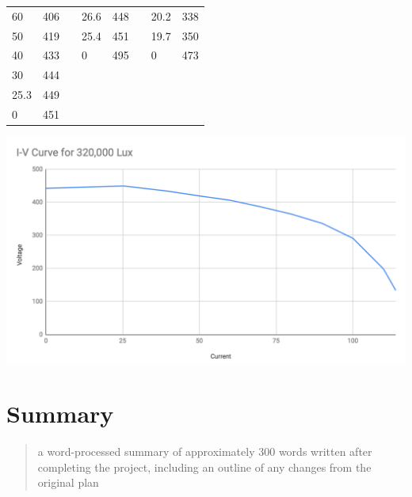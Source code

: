 \documentclass{article}
\begin{document}
\begin{table}[!ht]
\begin{tabular}{|l|l|l|l|l|l|l|l|}
60                     & 406               &                 & 26.6                   & 448               &                 & 20.2                   & 338               \\ \cline{1-2} \cline{4-5} \cline{7-8}
50                     & 419               &                 & 25.4                   & 451               &                 & 19.7                   & 350               \\ \cline{1-2} \cline{4-5} \cline{7-8}
40                     & 433               &                 & 0                      & 495               &                 & 0                      & 473               \\ \cline{1-2} \cline{4-5} \cline{7-8}
30                     & 444               &                 &                        &                   &                 &                        &                   \\ \cline{1-2} \cline{4-5} \cline{7-8}
25.3                   & 449               &                 &                        &                   &                 &                        &                   \\ \cline{1-2} \cline{4-5} \cline{7-8}
0                      & 451               &                 &                        &                   &                 &                        &                   \\ \cline{1-2} \cline{4-5} \cline{7-8}
\end{tabular}
\end{table}

\includegraphics[scale=0.4]{ivcurve1}


\section{Summary}
\begin{quote}
  a word-processed summary of approximately 300 words written after completing the project, including an outline of any changes from the original plan
\end{quote}
\end{document}
